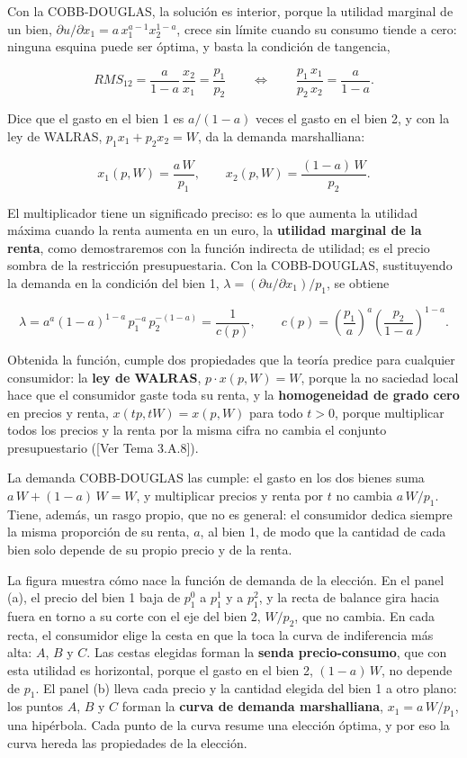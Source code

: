 \documentclass[10pt,a4paper]{article}
\newcommand{\authorfont}[1]{{\fontfamily{EBGaramond-TLF}\selectfont #1}}
\begin{document}
Con la COBB-DOUGLAS, la solución es interior, porque la utilidad marginal de un bien, $\partial u/\partial x_1=a\,x_1^{a-1}x_2^{1-a}$, crece sin límite cuando su consumo tiende a cero: ninguna esquina puede ser óptima, y basta la condición de tangencia,

$$RMS_{12}=\frac{a}{1-a}\,\frac{x_2}{x_1}=\frac{p_1}{p_2}\qquad\Longleftrightarrow\qquad \frac{p_1\,x_1}{p_2\,x_2}=\frac{a}{1-a}.$$

Dice que el gasto en el bien 1 es $a/(1-a)$ veces el gasto en el bien 2, y con la ley de WALRAS, $p_1x_1+p_2x_2=W$, da la demanda marshalliana:

$$x_1(p,W)=\frac{a\,W}{p_1},\qquad x_2(p,W)=\frac{(1-a)\,W}{p_2}.$$

El multiplicador tiene un significado preciso: es lo que aumenta la utilidad máxima cuando la renta aumenta en un euro, la \textbf{utilidad marginal de la renta}, como demostraremos con la función indirecta de utilidad; es el precio sombra de la restricción presupuestaria. Con la COBB-DOUGLAS, sustituyendo la demanda en la condición del bien 1, $\lambda=(\partial u/\partial x_1)/p_1$, se obtiene

$$\lambda=a^{a}(1-a)^{1-a}\,p_1^{-a}\,p_2^{-(1-a)}=\frac{1}{c(p)},\qquad c(p)=\left(\frac{p_1}{a}\right)^{a}\left(\frac{p_2}{1-a}\right)^{1-a}.$$

Obtenida la función, cumple dos propiedades que la teoría predice para cualquier consumidor: la \textbf{ley de WALRAS}, $p\cdot x(p,W)=W$, porque la no saciedad local hace que el consumidor gaste toda su renta, y la \textbf{homogeneidad de grado cero} en precios y renta, $x(tp,tW)=x(p,W)$ para todo $t>0$, porque multiplicar todos los precios y la renta por la misma cifra no cambia el conjunto presupuestario ([\authorfont{Ver Tema 3.A.8}]).

La demanda COBB-DOUGLAS las cumple: el gasto en los dos bienes suma $a\,W+(1-a)\,W=W$, y multiplicar precios y renta por $t$ no cambia $a\,W/p_1$. Tiene, además, un rasgo propio, que no es general: el consumidor dedica siempre la misma proporción de su renta, $a$, al bien 1, de modo que la cantidad de cada bien solo depende de su propio precio y de la renta.

La figura muestra cómo nace la función de demanda de la elección. En el panel (a), el precio del bien 1 baja de $p_1^0$ a $p_1^1$ y a $p_1^2$, y la recta de balance gira hacia fuera en torno a su corte con el eje del bien 2, $W/p_2$, que no cambia. En cada recta, el consumidor elige la cesta en que la toca la curva de indiferencia más alta: $A$, $B$ y $C$. Las cestas elegidas forman la \textbf{senda precio-consumo}, que con esta utilidad es horizontal, porque el gasto en el bien 2, $(1-a)\,W$, no depende de $p_1$. El panel (b) lleva cada precio y la cantidad elegida del bien 1 a otro plano: los puntos $A$, $B$ y $C$ forman la \textbf{curva de demanda marshalliana}, $x_1=a\,W/p_1$, una hipérbola. Cada punto de la curva resume una elección óptima, y por eso la curva hereda las propiedades de la elección.
\end{document}
